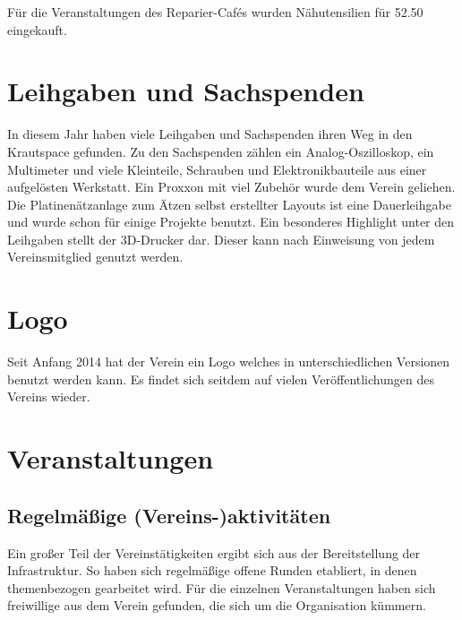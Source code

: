 \documentclass[ngerman]{scrartcl}
\begin{document}
Für die Veranstaltungen des Reparier-Cafés wurden Nähutensilien für \SI{52,50}{\EUR} eingekauft.

\section{Leihgaben und Sachspenden}

In diesem Jahr haben viele Leihgaben und Sachspenden ihren Weg in den Krautspace gefunden. 
Zu den Sachspenden zählen ein Analog-Oszilloskop, ein Multimeter und viele Kleinteile, Schrauben und Elektronikbauteile aus einer aufgelösten Werkstatt.
Ein Proxxon mit viel Zubehör wurde dem Verein geliehen.
Die Platinenätzanlage zum Ätzen selbst erstellter Layouts ist eine Dauerleihgabe und wurde schon für einige Projekte benutzt.
Ein besonderes Highlight unter den Leihgaben stellt der 3D-Drucker dar.
Dieser kann nach Einweisung von jedem Vereinsmitglied genutzt werden.

\section{Logo}

Seit Anfang 2014 hat der Verein ein Logo welches in unterschiedlichen Versionen benutzt werden kann. 
Es findet sich seitdem auf vielen Veröffentlichungen des Vereins wieder. 

\section{Veranstaltungen}

\subsection{Regelmäßige (Vereins-)aktivitäten}

Ein großer Teil der Vereinstätigkeiten ergibt sich aus der
Bereitstellung der Infrastruktur. So haben sich regelmäßige offene Runden
etabliert, in denen themenbezogen gearbeitet wird. Für die
einzelnen Veranstaltungen haben sich freiwillige aus dem Verein
gefunden, die sich um die Organisation kümmern.
\end{document}
